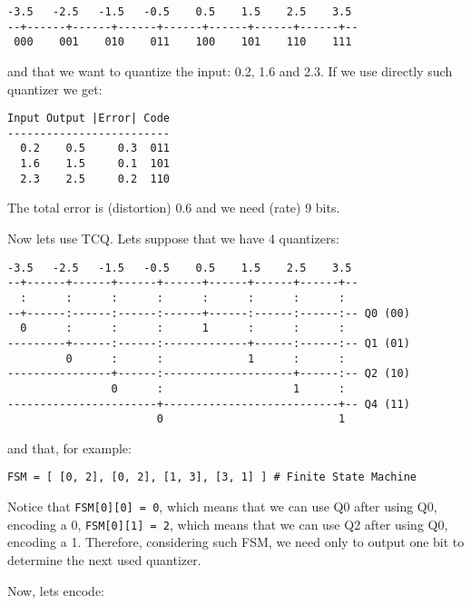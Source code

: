 \begin{verbatim}
-3.5   -2.5   -1.5   -0.5    0.5    1.5    2.5    3.5
--+------+------+------+------+------+------+------+--
 000    001    010    011    100    101    110    111
\end{verbatim}

and that we want to quantize the input: 0.2, 1.6 and 2.3. If we use
directly such quantizer we get:

\begin{verbatim}
Input Output |Error| Code
-------------------------
  0.2    0.5     0.3  011
  1.6    1.5     0.1  101
  2.3    2.5     0.2  110
\end{verbatim}

The total error is (distortion) 0.6 and we need (rate) 9 bits.

Now lets use TCQ. Lets suppose that we have 4 quantizers:

\begin{verbatim}
-3.5   -2.5   -1.5   -0.5    0.5    1.5    2.5    3.5
--+------+------+------+------+------+------+------+--
  :      :      :      :      :      :      :      :
--+------:------:------:------+------:------:------:-- Q0 (00)
  0      :      :      :      1      :      :      :
---------+------:------:-------------+------:------:-- Q1 (01)
         0      :      :             1      :      :
----------------+------:--------------------+------:-- Q2 (10)
                0      :                    1      :
-----------------------+---------------------------+-- Q4 (11)
                       0                           1                 
\end{verbatim}
 
and that, for example:

\begin{verbatim}
FSM = [ [0, 2], [0, 2], [1, 3], [3, 1] ] # Finite State Machine
\end{verbatim}

Notice that \verb|FSM[0][0] = 0|, which means that we can use Q0 after
using Q0, encoding a 0, \verb|FSM[0][1] = 2|, which means that we can
use Q2 after using Q0, encoding a 1. Therefore, considering such FSM,
we need only to output one bit to determine the next used quantizer.

Now, lets encode:

